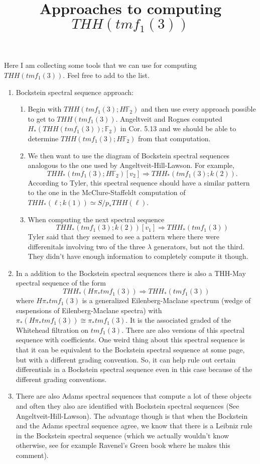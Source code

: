 \documentclass[11pt, oneside]{article}   	%
\title{Approaches to computing $THH(tmf_1(3))$ }
\date{}							%
\begin{document}
\maketitle
Here I am collecting some tools that we can use for computing $THH(tmf_1(3))$. Feel free to add to the list. 
\begin{enumerate}
	\item Bockstein spectral sequence approach:
	\begin{enumerate}
		\item Begin with $THH(tmf_1(3);H\mathbb{F}_2)$ and then use every approach possible to get to $THH(tmf_1(3))$. Angeltveit and Rognes computed $H_*(THH(tmf_1(3));\mathbb{F}_2)$ in Cor. 5.13 and we should be able to determine $THH(tmf_1(3);H\mathbb{F}_2)$ from that computation. 
		\item We then want to use the diagram of Bockstein spectral sequences analogous to the one used by Angeltveit-Hill-Lawson. For example, 
		\[ THH_*(tmf_1(3);H\mathbb{F}_2)[v_2] \Rightarrow THH_*(tmf_1(3);k(2)). \]
		According to Tyler, this spectral sequence should have a similar pattern to the one in the McClure-Staffeldt computation of $THH_*(\ell;k(1))\simeq S/p_*THH(\ell)$. 
		\item When computing the next spectral sequence 
		\[ THH_*(tmf_1(3);k(2))[v_1]\Rightarrow THH_*(tmf_1(3)) \] 
		Tyler said that they seemed to see a pattern where there were differenitals involving two of the three $\lambda$ generators, but not the third. They didn't have enough information to completely compute it though. 
	\end{enumerate}
	\item In a addition to the Bockstein spectral sequences there is also a THH-May spectral sequence of the form 
	\[ THH_*(H\pi_*tmf_1(3))\Rightarrow THH_*(tmf_1(3)) \]
	where $H\pi_*tmf_1(3)$ is a generalized Eilenberg-Maclane spectrum (wedge of suspensions of Eilenberg-Maclane spectra) with $\pi_*(H\pi_*tmf_1(3))\cong \pi_*tmf_1(3)$. It is the associated graded of the Whitehead filtration on $tmf_1(3)$. There are also versions of this spectral sequence with coefficients. One weird thing about this spectral sequence is that it can be equivalent to the Bockstein spectral sequence at some page, but with a different grading convention. So, it can help rule out certain differentials in a Bockstein spectral sequence even in this case because of the different grading conventions. 
	\item There are also Adams spectral sequences that compute a lot of these objects and often they also are identified with Bockstein spectral sequences  (See Angeltveit-Hill-Lawson). The advantage though is that when the Bockstein and the Adams spectral sequence agree, we know that there is a Leibniz rule in the Bockstein spectral sequence (which we actually wouldn't know otherwise, see for example Ravenel's Green book where he makes this comment). 

\end{enumerate}
\end{document}
